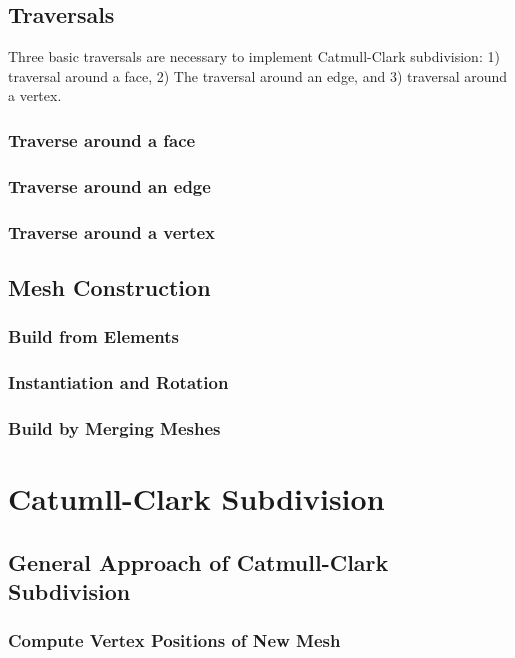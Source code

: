 \documentclass[12pt]{article}
\begin{document}
\subsection{Traversals} 
Three basic traversals are necessary to implement Catmull-Clark subdivision: 1) traversal around a face, 2) The traversal around an edge, and 3) traversal around a vertex.\\

\subsubsection{Traverse around a face}

\subsubsection{Traverse around an edge}

\subsubsection{Traverse around a vertex}


\subsection{Mesh Construction}
\subsubsection{Build from Elements}
\subsubsection{Instantiation and Rotation}
\subsubsection{Build by Merging Meshes}

\section{Catumll-Clark Subdivision} \label{sec:ccsd}

\subsection{General Approach of Catmull-Clark Subdivision}

\subsubsection{Compute Vertex Positions of New Mesh}
\end{document}
